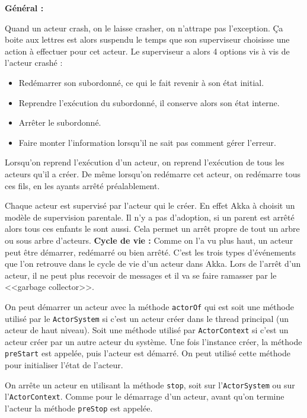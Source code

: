 \documentclass[12pt, a4paper]{article}
\begin{document}
\newline
\textbf{Général :}
\par Quand un acteur crash, on le laisse crasher, on n'attrape pas l'exception. Ça boite aux lettres est alors suspendu le temps que son superviseur choisisse une action à effectuer pour cet acteur. Le superviseur a alors 4 options vis à vis de l'acteur crashé :
\begin{itemize}
\item Redémarrer son subordonné, ce qui le fait revenir à son état initial.
\item Reprendre l’exécution du subordonné, il conserve alors son état interne.
\item Arrêter le subordonné.
\item Faire monter l'information lorsqu'il ne sait pas comment gérer l'erreur.
\end{itemize}
Lorsqu'on reprend l’exécution d'un acteur, on reprend l'exécution de tous les acteurs qu'il a créer. De même lorsqu'on redémarre cet acteur, on redémarre tous ces fils, en les ayants arrêté préalablement.
\par Chaque acteur est supervisé par l'acteur qui le créer. En effet Akka à choisit un modèle de supervision parentale. Il n'y a pas d'adoption, si un parent est arrêté alors tous ces enfants le sont aussi. Cela permet un arrêt propre de tout un arbre ou sous arbre d'acteurs.
\newline
\newline
\textbf{Cycle de vie :}
Comme on l'a vu plus haut, un acteur peut être démarrer, redémarré ou bien arrêté. C'est les trois types d’événements que l'on retrouve dans le cycle de vie d'un acteur dans Akka. Lors de l'arrêt d'un acteur, il ne peut plus recevoir de messages et il va se faire ramasser par le <<garbage collector>>.

\par On peut démarrer un acteur avec la méthode \verb!actorOf! qui est soit une méthode utilisé par le \verb!ActorSystem! si c'est un acteur créer dans le thread principal (un acteur de haut niveau). Soit une méthode utilisé par \verb!ActorContext! si c'est un acteur créer par un autre acteur du système. Une fois l'instance créer, la méthode \verb!preStart! est appelée, puis l'acteur est démarré. On peut utilisé cette méthode pour initialiser l'état de l'acteur.

\par On arrête un acteur en utilisant la méthode \verb!stop!, soit sur l'\verb!ActorSystem! ou sur l'\verb!ActorContext!. Comme pour le démarrage d'un acteur, avant qu'on termine l'acteur la méthode \verb!preStop! est appelée. 	 
\end{document}
